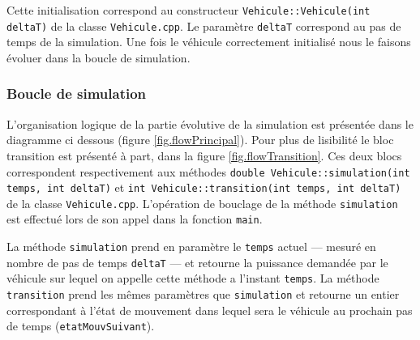 			Cette initialisation correspond au constructeur \texttt{Vehicule::Vehicule(int deltaT)} de la classe \texttt{Vehicule.cpp}. Le paramètre \texttt{deltaT} correspond au pas de temps de la simulation. Une fois le véhicule correctement initialisé nous le faisons évoluer dans la boucle de simulation.
	
		\subsubsection{Boucle de simulation \label{sec.descrSimulation}}
			
			L'organisation logique de la partie évolutive de la simulation est présentée dans le diagramme ci dessous (figure \ref{fig.flowPrincipal}). Pour plus de lisibilité le bloc transition est présenté à part, dans la figure \ref{fig.flowTransition}. Ces deux blocs correspondent respectivement aux méthodes \texttt{double Vehicule::simulation(int temps, int deltaT)} et \texttt{int Vehicule::transition(int temps, int deltaT)} de la classe \texttt{Vehicule.cpp}. L'opération de bouclage de la méthode \texttt{simulation} est effectué lors de son appel dans la fonction \texttt{main}.
			
			La méthode \texttt{simulation} prend en paramètre le \texttt{temps} actuel --- mesuré en nombre de pas de temps \texttt{deltaT} --- et retourne la puissance demandée par le véhicule sur lequel on appelle cette méthode a l'instant \texttt{temps}.
			La méthode \texttt{transition} prend les mêmes paramètres que \texttt{simulation} et retourne un entier correspondant à l'état de mouvement dans lequel sera le véhicule au prochain pas de temps (\texttt{etatMouvSuivant}).
			
			
		
